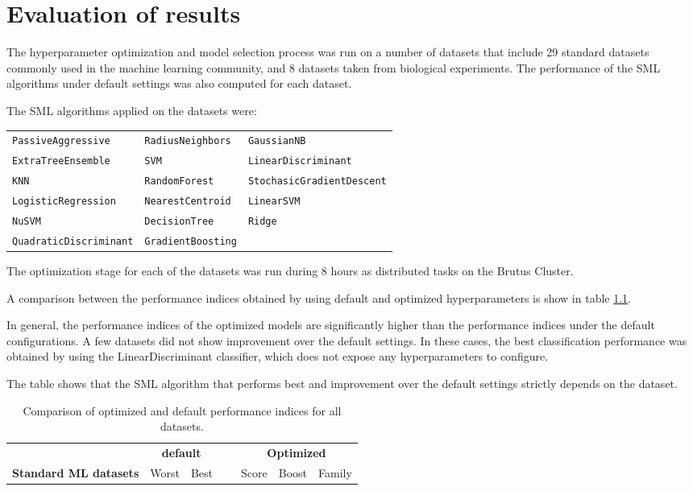 \chapter{Evaluation of results}


The hyperparameter optimization and model selection process was run on a number of datasets that
include 29 standard datasets commonly used in the machine learning community, and 8 datasets taken from
biological experiments. The performance of the SML algorithms under default settings was also
computed for each dataset.

The SML algorithms applied on the datasets were:

\begin{tabularx}{\textwidth}{l l l}
\texttt{PassiveAggressive} &
\texttt{RadiusNeighbors} &
\texttt{GaussianNB} \\
\texttt{ExtraTreeEnsemble} &
\texttt{SVM} &
\texttt{LinearDiscriminant} \\
\texttt{KNN} &
\texttt{RandomForest} &
\texttt{StochasicGradientDescent} \\
\texttt{LogisticRegression} &
\texttt{NearestCentroid} & 
\texttt{LinearSVM}\\
\texttt{NuSVM} &
\texttt{DecisionTree} &
\texttt{Ridge} \\
\texttt{QuadraticDiscriminant} &
\texttt{GradientBoosting} &
\end{tabularx}


The optimization stage for each of the datasets was run during 8 hours as distributed tasks on the
Brutus Cluster.

A comparison between the performance indices obtained by using default and optimized hyperparameters
is show in table \ref{tb:comparison_all}.

In general, the performance indices of the optimized models are significantly higher than the
performance indices under the default configurations. A few datasets did not show improvement over
the default settings. In these cases, the best classification performance was obtained by using the
LinearDiscriminant classifier, which does not expose any hyperparameters to configure.

The table shows that the SML algorithm that performs best and improvement over the default settings
strictly depends on the dataset.

\begin{table}[h!]
\centering
\begin{tabularx}{\textwidth}{l r r r r r l}
	& \multicolumn{2}{c}{\bf default} & ~ & \multicolumn{3}{c}{\bf Optimized}\\
	\cline{2-3}
	\cline{5-7}
{\bf Standard ML datasets} & Worst & Best & ~ & Score & Boost & Family\\
	\cline{1-7}
	
\end{tabularx}
\caption{Comparison of optimized and default performance indices for all datasets.}
\label{tb:comparison_all}
\end{table}

